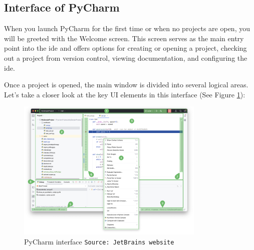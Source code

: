 \subsection{Interface of PyCharm}

When you launch PyCharm for the first time or when no projects are open, you will be greeted with the Welcome screen. This screen serves as the main entry point into the \ac{ide} and offers options for creating or opening a project, checking out a project from version control, viewing documentation, and configuring the \ac{ide}.

Once a project is opened, the main window is divided into several logical areas. Let's take a closer look at the key UI elements in this interface (See Figure \ref{fig:PyCharmInterface}):

\begin{figure}[h!]
	\centering
	\includegraphics[width=0.8\textwidth]{Images/IDE/PyCharmMainWindow.png}
	\caption{PyCharm interface \texttt{Source: JetBrains website}} \label{fig:PyCharmInterface}
\end{figure}


